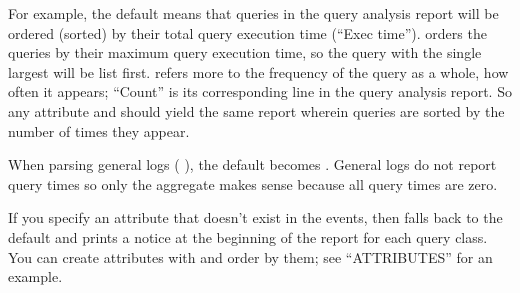 \documentclass[letterpaper,10pt,english]{sphinxmanual}
\begin{document}
\begin{fulllineitems}
\sphinxAtStartPar
For example, the default  means that queries in the
query analysis report will be ordered (sorted) by their total query execution
time (“Exec time”).   orders the queries by their
maximum query execution time, so the query with the single largest
 will be list first.   refers more to the frequency
of the query as a whole, how often it appears; “Count” is its corresponding
line in the query analysis report.  So any attribute and  should yield
the same report wherein queries are sorted by the number of times they
appear.

\sphinxAtStartPar
When parsing general logs ({\hyperref[\detokenize{mariadb-query-digest:cmdoption-mariadb-query-digest-type}]{}} ), the default {\hyperref[\detokenize{mariadb-query-digest:cmdoption-mariadb-query-digest-order-by}]{}}
becomes .  General logs do not report query times so only
the  aggregate makes sense because all query times are zero.

\sphinxAtStartPar
If you specify an attribute that doesn’t exist in the events, then
 falls back to the default  and prints a notice
at the beginning of the report for each query class.  You can create attributes
with {\hyperref[\detokenize{mariadb-query-digest:cmdoption-mariadb-query-digest-filter}]{}} and order by them; see “ATTRIBUTES” for an example.

\end{fulllineitems}

\end{document}
